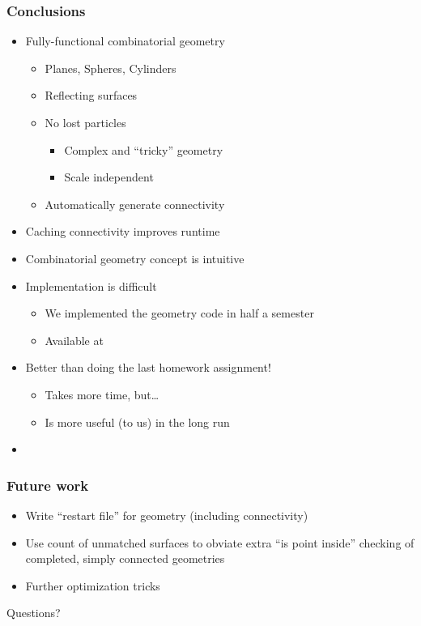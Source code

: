 \documentclass[color={usenames, dvipsnames},ignorenonframetext]{beamer}
\begin{document}
\begin{frame}
  \frametitle{Conclusions}
  \begin{itemize}
    \item<1-> Fully-functional combinatorial geometry
        \begin{itemize}
            \item Planes, Spheres, Cylinders
            \item Reflecting surfaces
            \item No lost particles
                \begin{itemize}
                    \item Complex and ``tricky'' geometry
                    \item Scale independent
                \end{itemize}
            \item Automatically generate connectivity
        \end{itemize}
    \item<2-> Caching connectivity improves runtime
   
    \item<3-> Combinatorial geometry concept is intuitive
    \item<4-> Implementation is difficult
        \begin{itemize}
            \item We implemented the geometry code in half a semester
            \item Available at \color{blue}{http://code.google.com/p/mcgeometry}
        \end{itemize}
     \item<5-> Better than doing the last homework assignment!
         \begin{itemize}
             \item Takes more time, but\dots
             \item Is more useful (to us) in the long run
         \end{itemize}
     \item<6-> \color{red}{We deserve an A+}
  \end{itemize}
\end{frame}

\begin{frame}
  \frametitle{Future work}
  \begin{itemize}
	 \item Write ``restart file'' for geometry (including connectivity)
   \item Use count of unmatched surfaces to obviate extra ``is point inside''
     checking of completed, simply connected geometries
   \item Further optimization tricks
  \end{itemize}
\end{frame}
\appendix
\begin{frame}
  \begin{center}
    {\Huge Questions?}
  \end{center}
\end{frame}
\end{document}
